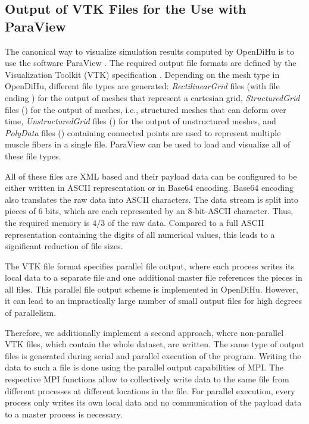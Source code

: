 \subsection{Output of VTK Files for the Use with ParaView}
The canonical way to visualize simulation results computed by OpenDiHu is to use the software ParaView \cite{paraview}. 
The required output file formats are defined by the Visualization Toolkit (VTK) specification \cite{vtk}. Depending on the mesh type in OpenDiHu, different file types are generated:
\emph{RectilinearGrid} files (with file ending ) for the output of  meshes that represent a cartesian grid,
\emph{StructuredGrid} files () for the output of  meshes, i.e., structured meshes that can deform over time, 
\emph{UnstructuredGrid} files () for the output of unstructured meshes, and
\emph{PolyData} files () containing connected points are used to represent multiple muscle fibers in a single file.
ParaView can be used to load and visualize all of these file types.

All of these files are XML based and their payload data can be configured to be either written in ASCII representation or in Base64 encoding. Base64 encoding also translates the raw data into ASCII characters. The data stream is split into pieces of 6 bits, which are each represented by an 8-bit-ASCII character. Thus, the required memory is $4/3$ of the raw data. Compared to a full ASCII representation containing the digits of all numerical values, this leads to a significant reduction of file sizes.

The VTK file format specifies parallel file output, where each process writes its local data to a separate file and one additional master file references the pieces in all files. This parallel file output scheme is implemented in OpenDiHu. However, it can lead to an impractically large number of small output files for high degrees of parallelism. 

Therefore, we additionally implement a second approach, where non-parallel VTK files, which contain the whole dataset, are written. The same type of output files is generated during serial and parallel execution of the program. 
Writing the data to such a file is done using the parallel output capabilities of MPI. The respective MPI functions allow to collectively write data to the same file from different processes at different locations in the file. For parallel execution, every process only writes its own local data and no communication of the payload data to a master process is necessary. 

